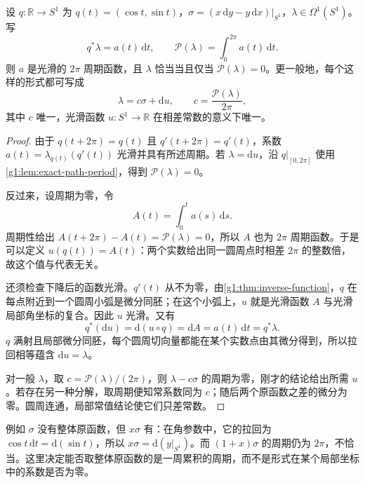 \begin{proposition}
	\label{g1:prop:circle-exactness-period}
	设 \(q:\mathbb R\to S^1\) 为 \(q(t)=(\cos t,\sin t)\)，\(\sigma=(x\,\mathrm{d}y-y\,\mathrm{d}x)|_{S^1}\)，\(\lambda\in\Omega^1(S^1)\)。写
	\[
		q^*\lambda=a(t)\,\mathrm{d}t,\qquad
		\mathcal P(\lambda)=\int_0^{2\pi}a(t)\,\mathrm{d}t.
	\]
	则 \(a\) 是光滑的 \(2\pi\) 周期函数，且 \(\lambda\) 恰当当且仅当 \(\mathcal P(\lambda)=0\)。更一般地，每个这样的形式都可写成
	\[
		\lambda=c\sigma+\mathrm{d}u,\qquad
		c=\frac{\mathcal P(\lambda)}{2\pi},
	\]
	其中 \(c\) 唯一，光滑函数 \(u:S^1\to\mathbb R\) 在相差常数的意义下唯一。
\end{proposition}
\begin{proof}
	由于 \(q(t+2\pi)=q(t)\) 且 \(q'(t+2\pi)=q'(t)\)，系数 \(a(t)=\lambda_{q(t)}(q'(t))\) 光滑并具有所述周期。若 \(\lambda=\mathrm{d}u\)，沿 \(q|_{[0,2\pi]}\) 使用\cref{g1:lem:exact-path-period}，得到 \(\mathcal P(\lambda)=0\)。

	反过来，设周期为零，令
	\[
		A(t)=\int_0^t a(s)\,\mathrm{d}s.
	\]
	周期性给出 \(A(t+2\pi)-A(t)=\mathcal P(\lambda)=0\)，所以 \(A\) 也为 \(2\pi\) 周期函数。于是可以定义 \(u(q(t))=A(t)\)：两个实数给出同一圆周点时相差 \(2\pi\) 的整数倍，故这个值与代表无关。

	还须检查下降后的函数光滑。\(q'(t)\) 从不为零，由\cref{g1:thm:inverse-function}，\(q\) 在每点附近到一个圆周小弧是微分同胚；在这个小弧上，\(u\) 就是光滑函数 \(A\) 与光滑局部角坐标的复合。因此 \(u\) 光滑。又有
	\[
		q^*(\mathrm{d}u)=\mathrm{d}(u\circ q)=\mathrm{d}A
		=a(t)\,\mathrm{d}t=q^*\lambda.
	\]
	\(q\) 满射且局部微分同胚，每个圆周切向量都能在某个实数点由其微分得到，所以拉回相等蕴含 \(\mathrm{d}u=\lambda\)。

	对一般 \(\lambda\)，取 \(c=\mathcal P(\lambda)/(2\pi)\)，则 \(\lambda-c\sigma\) 的周期为零，刚才的结论给出所需 \(u\)。若存在另一种分解，取周期便知常系数同为 \(c\)；随后两个原函数之差的微分为零。圆周连通，局部常值结论使它们只差常数。
\end{proof}

例如 \(\sigma\) 没有整体原函数，但 \(x\sigma\) 有：在角参数中，它的拉回为 \(\cos t\,\mathrm{d}t=\mathrm{d}(\sin t)\)，所以 \(x\sigma=\mathrm{d}(y|_{S^1})\)。而 \((1+x)\sigma\) 的周期仍为 \(2\pi\)，不恰当。这里决定能否取整体原函数的是一周累积的周期，而不是形式在某个局部坐标中的系数是否为零。
